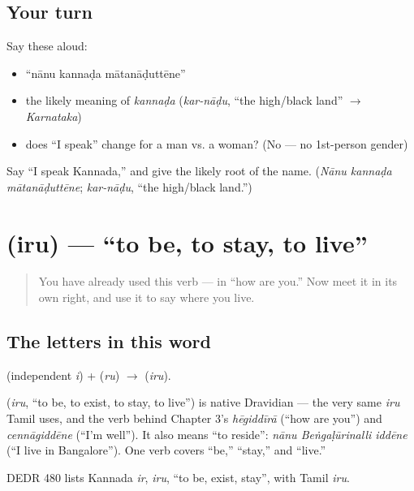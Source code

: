 \subsection*{Your turn}
Say these aloud:

\begin{itemize}
\raggedright
  \item \textquotedblleft{}nānu kannaḍa mātanāḍuttēne\textquotedblright{}
  \item the likely meaning of \emph{kannaḍa} (\emph{kar-nāḍu}, \textquotedblleft{}the high/black land\textquotedblright{} $\to$ \emph{Karnataka})
  \item does \textquotedblleft{}I speak\textquotedblright{} change for a man vs. a woman? (No — no 1st-person gender)
\end{itemize}

\begin{tcolorbox}[breakable,colback=teal!4,colframe=teal!35!black,title={Before you move on}]
Say \textquotedblleft{}I speak Kannada,\textquotedblright{} and give the likely root of the name. (\emph{Nānu kannaḍa mātanāḍuttēne}; \emph{kar-nāḍu}, \textquotedblleft{}the high/black land.\textquotedblright{})
\end{tcolorbox}
\section[\texorpdfstring{\kn{ಇರು} (iru)}{ಇರು (iru)}]{ (iru) — \textquotedblleft{}to be, to stay, to live\textquotedblright{}}

\label{lesson:KA-C05-iru}



\begin{quote}
You have already used this verb — in \textquotedblleft{}how are you.\textquotedblright{} Now meet it in its own right, and use it to say where you live.
\end{quote}

\subsection*{The letters in this word}
\textbf{} (independent \emph{i}) + \textbf{} (\emph{ru}) $\to$ \textbf{} (\emph{iru}).

\begin{cousinweb}
\textbf{} (\emph{iru}, \textquotedblleft{}to be, to exist, to stay, to live\textquotedblright{}) is native Dravidian — the very same \emph{iru} Tamil uses, and the verb behind Chapter 3's \emph{hēgiddīrā} (\textquotedblleft{}how are you\textquotedblright{}) and \emph{cennāgiddēne} (\textquotedblleft{}I'm well\textquotedblright{}). It also means \textquotedblleft{}to reside\textquotedblright{}: \emph{nānu Beṅgaḷūrinalli iddēne} (\textquotedblleft{}I live in Bangalore\textquotedblright{}). One verb covers \textquotedblleft{}be,\textquotedblright{} \textquotedblleft{}stay,\textquotedblright{} and \textquotedblleft{}live.\textquotedblright{}

DEDR 480 lists Kannada \emph{ir}, \emph{iru}, \textquotedblleft{}to be, exist, stay\textquotedblright{}, with Tamil \emph{iru}.
\end{cousinweb}


